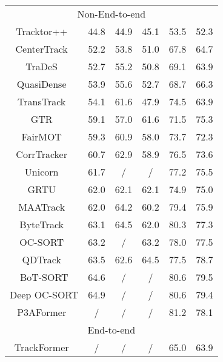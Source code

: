 \documentclass{article}
\begin{document}
\begin{table}[htbp]
\begin{subtable}[b]{0.45\textwidth}
\begin{tabular}{@{\hspace{1pt}}c@{\hspace{1pt}}c@{\hspace{3pt}}c@{\hspace{3pt}}c@{\hspace{3pt}}c@{\hspace{3pt}}c@{\hspace{1pt}}}
            \hline
            \multicolumn{6}{c}{Non-End-to-end}  \\
Tracktor++~\cite{bergmann2019tracking}      & 44.8 & 44.9 & 45.1 & 53.5 & 52.3 \\
            CenterTrack~\cite{stone2000centertrack}     & 52.2 & 53.8 & 51.0 & 67.8 & 64.7 \\
            TraDeS~\cite{wu2021track}                   & 52.7 & 55.2 & 50.8 & 69.1 & 63.9 \\
            QuasiDense~\cite{pang2021quasi}             & 53.9 & 55.6 & 52.7 & 68.7 & 66.3 \\
            TransTrack~\cite{sun2020transtrack}         & 54.1 & 61.6 & 47.9 & 74.5 & 63.9 \\
            GTR~\cite{zhou2022global}                   & 59.1 & 57.0 & 61.6 & 71.5 & 75.3 \\
            FairMOT~\cite{zhang2021fairmot}             & 59.3 & 60.9 & 58.0 & 73.7 & 72.3 \\
            CorrTracker~\cite{wang2021multiple}         & 60.7 & 62.9 & 58.9 & 76.5 & 73.6 \\
            Unicorn~\cite{yan2022towards}               & 61.7 & /    & /    & 77.2 & 75.5 \\
            GRTU~\cite{wang2021general}                 & 62.0 & 62.1 & 62.1 & 74.9 & 75.0 \\
            MAATrack~\cite{stadler2022modelling}        & 62.0 & 64.2 & 60.2 & 79.4 & 75.9 \\
            ByteTrack~\cite{zhang2022bytetrack}         & 63.1 & 64.5 & 62.0 & 80.3 & 77.3 \\
            OC-SORT~\cite{cao2022observation}           & 63.2 & /    & 63.2 & 78.0 & 77.5 \\
            QDTrack~\cite{fischer2022qdtrack}           & 63.5 & 62.6 & 64.5 & 77.5 & 78.7 \\
            BoT-SORT\cite{aharon2022bot}                & 64.6 & /    & /    & 80.6 & 79.5 \\
            Deep OC-SORT\cite{maggiolino2023deep}       & 64.9 & /    & /    & 80.6 & 79.4 \\
            P3AFormer~\cite{zhao2022tracking}           & /    & /    & /    & 81.2 & 78.1 \\
            \hline
            \multicolumn{6}{c}{End-to-end} \\
            TrackFormer~\cite{meinhardt2022trackformer} & /    & /    & /    & 65.0 & 63.9 \\

\end{tabular}
\end{subtable}
\end{table}
\end{document}
